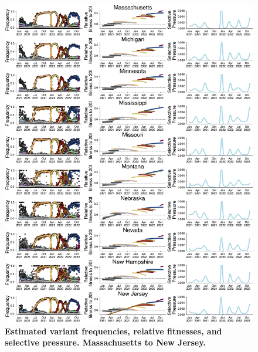 \documentclass[11pt,oneside,letterpaper]{article}
\begin{document}
\begin{figure}[t!]
    \centering
    \includegraphics[width=1.0\textwidth=0.01]{./supplementary_figures/selective-pressure-analysis_group_3.png}
    \caption{
      \textbf{Estimated variant frequencies, relative fitnesses, and selective pressure. Massachusetts to New Jersey.}
    }
    \label{fig:selective_pressure_group_3}
\end{figure}
\end{document}
